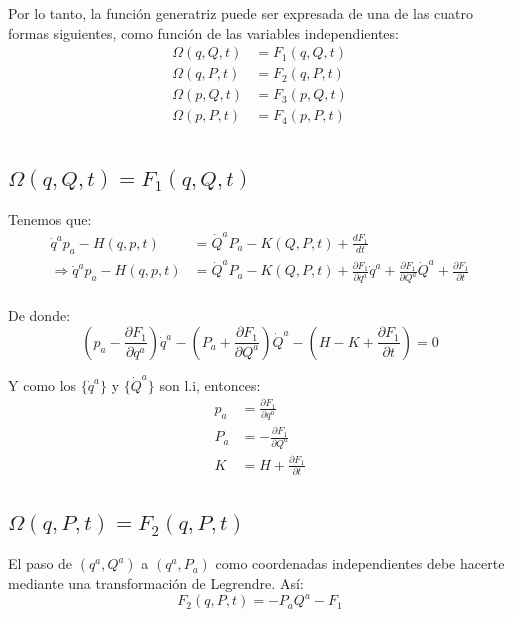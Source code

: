 \documentclass[12pt]{report}
\begin{document}
Por lo tanto, la funci\'on generatriz puede ser expresada de una de las cuatro formas siguientes, como
funci\'on de las variables independientes:
	\begin{align*}
		\Omega(q,Q,t) &= F_{1}(q,Q,t) \\
		\Omega(q,P,t) &= F_{2}(q,P,t) \\
		\Omega(p,Q,t) &= F_{3}(p,Q,t) \\
		\Omega(p,P,t) &= F_{4}(p,P,t) \\
	\end{align*}

\subsection{$\Omega(q,Q,t) = F_{1}(q,Q,t)$}

Tenemos que:
	\begin{align}
		\dot{q}^{a}p_{a} - H(q,p,t) &=  \dot{Q}^{a}P_{a} - K(Q,P,t)  + \frac{dF_{1}}{dt} \\ \label{eqF1}
\Rightarrow \dot{q}^{a}p_{a} - H(q,p,t) &=  \dot{Q}^{a}P_{a} - K(Q,P,t)  + \frac{\partial F_{1}}{\partial q^{a}}\dot{q}^{a} 
										   +\frac{\partial F_{1}}{\partial Q^{a}}\dot{Q}^{a} + \frac{\partial F_{1}}{\partial t}\\
	\end{align}

De donde:
	\begin{equation*}
		\left(p_{a} - \frac{\partial F_{1}}{\partial q^{a}} \right)\dot{q}^{a}
	   -\left( P_{a} +\frac{\partial F_{1}}{\partial Q^{a}} \right)\dot{Q}^{a}
	   - \left(H - K + \frac{\partial F_{1}}{\partial t}\right)  = 0
	\end{equation*}
	
Y como los $\{ \dot{q}^{a} \}$ y $\{ \dot{Q}^{a} \}$ son l.i, entonces:
	\begin{align*}
		p_{a} &= \frac{\partial F_{1}}{\partial q^{a}}\\
		P_{a} &= -\frac{\partial F_{1}}{\partial Q^{a}} \\
		K &= H + \frac{\partial F_{1}}{\partial t}
	\end{align*}

\subsection{$\Omega(q,P,t) = F_{2}(q,P,t)$}

El paso de $(q^{a},Q^{a})$  a $(q^{a},P_{a})$ como coordenadas independientes debe hacerte mediante una transformaci\'on de Legrendre.
As\'i:
	\begin{equation*}
		F_{2}(q,P,t) = -P_{a}Q^{a} - F_{1}
	\end{equation*}
\end{document}
